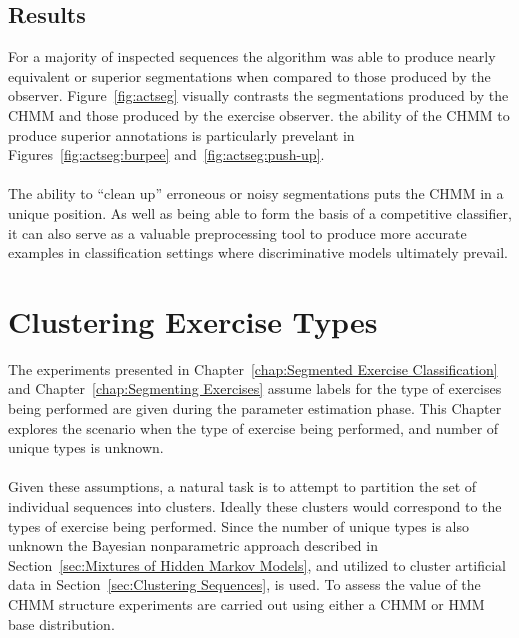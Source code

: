 \documentclass[12pt]{report}
\newcommand{\1}[0]{\mathbbm{1}}
\begin{document}
\section{Results}
For a majority of inspected sequences the algorithm was able to produce nearly
equivalent or superior segmentations when compared to those produced by the observer.
Figure~\ref{fig:actseg} visually contrasts the segmentations produced by the \ac{CHMM}
and those produced by the exercise observer. the ability of the \ac{CHMM} to produce
superior annotations is particularly prevelant in Figures~\ref{fig:actseg:burpee}
and~\ref{fig:actseg:push-up}.
\\\\
The ability to ``clean up'' erroneous or noisy segmentations puts the \ac{CHMM}
in a unique position. As well as being able to form the basis of a competitive classifier,
it can also serve as a valuable preprocessing tool to produce more accurate examples in
classification settings where discriminative models ultimately prevail.

\chapter{Clustering Exercise Types}
\label{chap:Clustering Exercise Types}
The experiments presented in Chapter~\ref{chap:Segmented Exercise Classification}
and Chapter~\ref{chap:Segmenting Exercises} assume labels for the type of exercises
being performed are given during the parameter estimation phase. This Chapter explores
the scenario when the type of exercise being performed, and number of unique types is unknown.
\\\\
Given these assumptions, a natural task is to attempt to partition the
set of individual sequences into clusters. Ideally these clusters would
correspond to the types of exercise being performed. Since the number of
unique types is also unknown the Bayesian nonparametric approach described in
Section~\ref{sec:Mixtures of Hidden Markov Models}, and utilized to cluster
artificial data in Section~\ref{sec:Clustering Sequences}, is used. To assess the
value of the \ac{CHMM} structure experiments are carried out using either a \ac{CHMM}
or \ac{HMM} base distribution.
\end{document}
